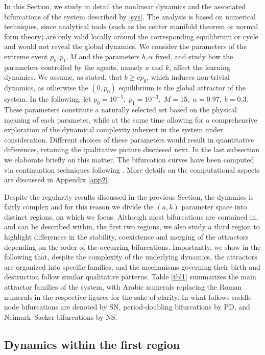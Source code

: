 \documentclass{article}
\theoremstyle{plain}
\theoremstyle{definition}
\begin{document}
In this Section, we study in detail the nonlinear dynamics and the associated bifurcations of the system described by \eqref{sys}. The analysis is based on numerical techniques, since analytical tools (such as the center manifold theorem or normal form theory) are only valid locally around the corresponding equilibrium or cycle and would not reveal the global dynamics. We consider the parameters of the extreme event $p_0,p_1,M$ and the parameters $b,\alpha$ fixed, and study how the parameters controlled by the agents, namely $a$ and $k$, affect the learning dynamics. We assume, as stated, that $b\geq cp_0$, which induces non-trivial dynamics, as otherwise the $(0,p_0)$ equilibrium is the global attractor of the system. In the following, let $p_0=10^{-5},\; p_1=10^{-3}, \; M=15, \; \alpha=0.97, \; b=0.3$. These parameters constitute a naturally selected set based on the physical meaning of each parameter, while at the same time allowing for a comprehensive exploration of the dynamical complexity inherent in the system under consideration. Different choices of these parameters would result in quantitative differences, retaining the qualitative picture discussed next. In the last subsection we elaborate briefly on this matter. The bifurcation curves have been computed via continuation techniques following  \cite{matcont,datseris}. More details on the computational aspects are discussed in Appendix \ref{app2}.

Despite the regularity results discussed in the previous Section, the dynamics is fairly complex and for this reason we divide the $(a,k)$ parameter space into distinct regions, on which we focus. Although most bifurcations are contained in, and can be described within, the first two regions, we also study a third region to highlight differences in the stability, coexistence and merging of the attractors depending on the order of the occurring bifurcations. Importantly, we show in the following that, despite the complexity of the underlying dynamics, the attractors are organized into specific families, and the mechanisms governing their birth and destruction follow similar qualitative patterns. Table \ref{tbl1} summarizes the main attractor families of the system, with Arabic numerals replacing the Roman numerals in the respective figures for the sake of clarity. In what follows saddle-node bifurcations are denoted by SN, period-doubling bifurcations by PD, and Neimark--Sacker bifurcations by NS.



\subsection{Dynamics within the first region}\label{sec3.1}
\end{document}
